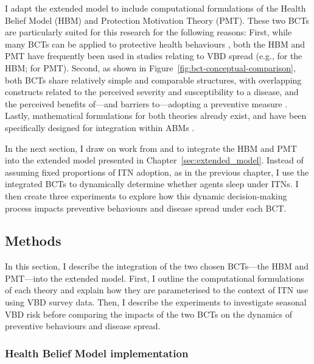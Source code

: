 I adapt the extended model to include computational formulations of the Health Belief Model (HBM) and Protection Motivation Theory (PMT). These two BCTs are particularly suited for this research for the following reasons: First, while many BCTs can be applied to protective health behaviours \cite{vande_velde_integrated_2024}, both the HBM and PMT have frequently been used in studies relating to VBD spread (e.g., \cite{watanabe_determinants_2014, yirsaw_insecticide-treated_2021, donohoe_tick-borne_2018} for the HBM; \cite{ghahremani_effect_2014} for PMT). Second, as shown in Figure~\ref{fig:bct-conceptual-comparison}, both BCTs share relatively simple and comparable structures, with overlapping constructs related to the perceived severity and susceptibility to a disease, and the perceived benefits of---and barriers to---adopting a preventive measure \cite{marikyan_protection_2023, weinstein_testing_1993, champion_health_2015}. Lastly, mathematical formulations for both theories already exist, and have been specifically designed for integration within ABMs \cite{durham_incorporating_2012,kurchyna_seeing_2024}.

In the next section, I draw on work from \citet{durham_incorporating_2012} and \citet{kurchyna_seeing_2024} to integrate the HBM and PMT into the extended model presented in Chapter~\ref{sec:extended_model}. Instead of assuming fixed proportions of ITN adoption, as in the previous chapter, I use the integrated BCTs to dynamically determine whether agents sleep under ITNs. I then create three experiments to explore how this dynamic decision-making process impacts preventive behaviours and disease spread under each BCT.

\subsection{Methods}

In this section, I describe the integration of the two chosen BCTs---the HBM and PMT---into the extended model. First, I outline the computational formulations of each theory and explain how they are parameterised to the context of ITN use using VBD survey data. Then, I describe the experiments to investigate seasonal VBD risk before comparing the impacts of the two BCTs on the dynamics of preventive behaviours and disease spread.

\subsubsection{Health Belief Model implementation}

